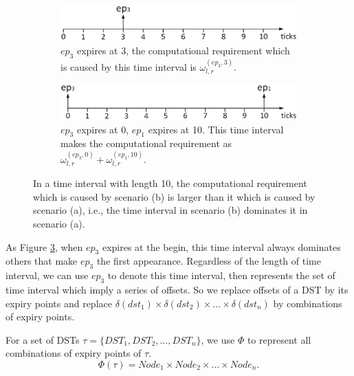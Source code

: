 \documentclass[sigconf]{acmart}
\begin{document}
\begin{figure}  
  \centering
  \begin{subfigure}[t]{3.33in}
    \centering
    \includegraphics[scale=.34]{graphics/figure_combina2.eps}
    \caption{$ep_3$ expires at 3, the computational requirement which is caused by this time interval is $\omega_{l,r}^{(ep_3,3)}.$}\label{figure_combination1}
  \end{subfigure}
  \quad
  \begin{subfigure}[t]{3.33in}
    \centering
    \includegraphics[scale=.34]{graphics/figure_combina1.eps}
    \caption{$ep_3$ expires at 0, $ep_1$ expires at 10. This time interval makes the computational requirement as $\omega_{l,r}^{(ep_3,0)}+\omega_{l,r}^{(ep_1,10)}$.}\label{figure_combination2}
  \end{subfigure}
  \caption{In a time interval with length 10, the computational requirement which is caused by scenario (b) is larger than it which is caused by scenario (a), i.e., the time interval in scenario (b) dominates it in scenario (a).}\label{figure_combination}
\end{figure}
As Figure \ref{figure_combination}, when $ep_3$ expires at the begin, this time interval always dominates others that make $ep_3$ the first appearance. Regardless of the length of time interval, we can use $ep_3$ to denote this time interval, then represents the set of time interval which imply a series of offsets. So we replace offsets of a DST by its expiry points and replace $\delta(dst_1)\times\delta(dst_2)\times\dots\times\delta(dst_n)$ by combinations of expiry points.
\begin{definition}
For a set of DSTs $\tau=\{DST_1,DST_2,\dots,DST_n\}$, we use $\Phi$ to represent all combinations of expiry points of $\tau$.
\begin{equation}
  \Phi(\tau)=Node_1 \times Node_2\times\dots\times Node_n.
\end{equation}\label{equation_combination}
\end{definition}
\end{document}
